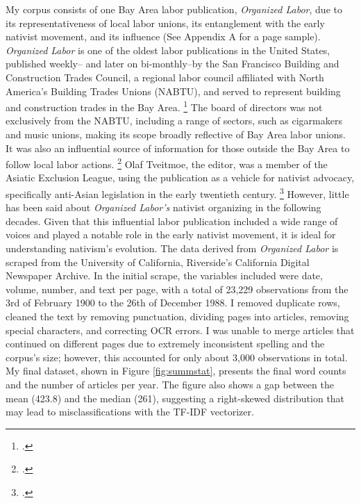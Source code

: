 \documentclass[12pt,a4paper]{article}
\begin{document}
My corpus consists of one Bay Area labor publication, \textit{Organized Labor}, due to its representativeness of local labor unions, its entanglement with the early nativist movement, and its influence (See Appendix A for a page sample). \textit{Organized Labor} is one of the oldest labor publications in the United States, published weekly-- and later on bi-monthly--by the San Francisco Building and Construction Trades Council, a regional labor council affiliated with North America's Building Trades Unions (NABTU), and served to represent building and construction trades in the Bay Area. \footcite{kazin_barons_1989} The board of directors was not exclusively from the NABTU, including a range of sectors, such as cigarmakers and music unions, making its scope broadly reflective of Bay Area labor unions. It was also an influential source of information for those outside the Bay Area to follow local labor actions. \footcite{kazin_barons_1989} Olaf Tveitmoe, the editor, was a member of the Asiatic Exclusion League, using the publication as a vehicle for nativist advocacy, specifically anti-Asian legislation in the early twentieth century. \footcite{mcwilliams_brothers_1951} However, little has been said about \textit{Organized Labor’s} nativist organizing in the following decades. Given that this influential labor publication included a wide range of voices and played a notable role in the early nativist movement, it is ideal for understanding nativism’s evolution. The data derived from \textit{Organized Labor} is scraped from the University of California, Riverside's California Digital Newspaper Archive. In the initial scrape, the variables included were date, volume, number, and text per page, with a total of 23,229 observations from the 3rd of February 1900 to the 26th of December 1988. I removed duplicate rows, cleaned the text by removing punctuation, dividing pages into articles, removing special characters, and correcting OCR errors. I was unable to merge articles that continued on different pages due to extremely inconsistent spelling and the corpus's size; however, this accounted for only about 3,000 observations in total. My final dataset, shown in Figure \ref{fig:summstat}, presents the final word counts and the number of articles per year. The figure also shows a gap between the mean (423.8) and the median (261), suggesting a right-skewed distribution that may lead to misclassifications with the TF-IDF vectorizer. 

\vspace{0.5cm}
\begin{table}
	\centering 
	\caption{Summary Statistics}
	\label{fig:summstat}
\end{table}
\end{document}
